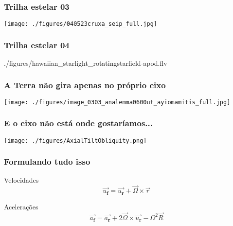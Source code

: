 \begin{frame}
  \frametitle{Trilha estelar 03}
  \begin{center}
    \texttt{[image: ./figures/040523cruxa\_seip\_full.jpg]}
  \end{center}
\end{frame}


\begin{frame}
  \frametitle{Trilha estelar 04}
  \begin{center}
  {./figures/hawaiian_starlight_rotatingstarfield-apod.flv}
  \end{center}
\end{frame}

\begin{frame}
  \frametitle{A Terra não gira apenas no próprio eixo}
  \begin{center}
    \texttt{[image: ./figures/image\_0303\_analemma0600ut\_ayiomamitis\_full.jpg]}
  \end{center}
\end{frame}


\begin{frame}
  \frametitle{E o eixo não está onde gostaríamos...}
  \begin{center}
    \texttt{[image: ./figures/AxialTiltObliquity.png]}
  \end{center}
\end{frame}


\begin{frame}
  \frametitle{Formulando tudo isso}
  \begin{block}{Velocidades}
    \[
      \vec{u_{\mathbf{f}}} = \vec{u_{\mathbf{r}}} + \vec{\Omega} \times \vec{r}
    \]
  \end{block}

  \begin{block}{Acelerações}
    \[
      \vec{a_{\mathbf{f}}} = \vec{a_{\mathbf{r}}} + 2 \vec{\Omega} \times
      \vec{u_{\mathbf{r}}} - \Omega^2\vec{R}
    \]
  \end{block}
\end{frame}


